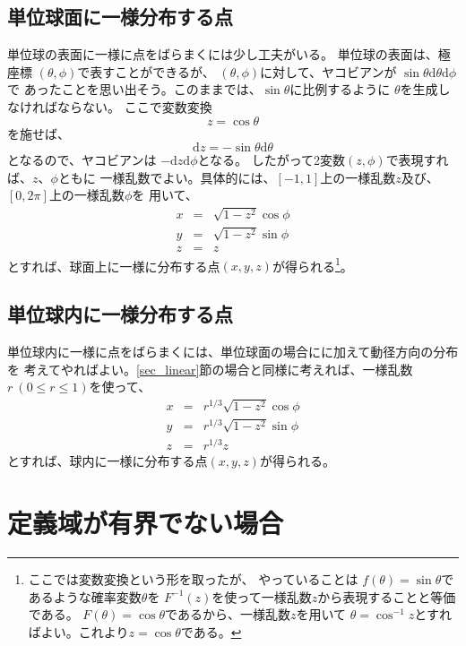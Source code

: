 \documentclass{jarticle}
\newcommand{\diff}{{\mathrm d}}
\begin{document}
\subsection{単位球面に一様分布する点}

単位球の表面に一様に点をばらまくには少し工夫がいる。
単位球の表面は、極座標 $(\theta,\phi)$で表すことができるが、
$(\theta,\phi)$に対して、ヤコビアンが $\sin \theta \diff \theta \diff \phi$で
あったことを思い出そう。このままでは、$\sin \theta$に比例するように
$\theta$を生成しなければならない。
ここで変数変換
\begin{equation}
z = \cos \theta
\end{equation}
を施せば、
\begin{equation}
\diff z = -\sin \theta \diff \theta
\end{equation}
となるので、ヤコビアンは $-\diff z \diff \phi$となる。
したがって2変数$(z,\phi)$で表現すれば、$z$、$\phi$ともに
一様乱数でよい。具体的には、$[-1,1]$上の一様乱数$z$及び、$[0,2\pi]$上の一様乱数$\phi$を
用いて、
\begin{eqnarray}
x &=& \sqrt{1-z^2} \cos \phi \\
y &=& \sqrt{1-z^2} \sin \phi\\
z &=& z 
\end{eqnarray}
とすれば、球面上に一様に分布する点$(x,y,z)$が得られる\footnote{
ここでは変数変換という形を取ったが、
やっていることは $f(\theta) = \sin \theta$であるような確率変数$\theta$を
$F^{-1}(z)$を使って一様乱数$z$から表現することと等価である。
$F(\theta) = \cos \theta$であるから、一様乱数$z$を用いて
$\theta = \cos^{-1} z$とすればよい。これより$z = \cos \theta$である。
}。

\subsection{単位球内に一様分布する点}

単位球内に一様に点をばらまくには、単位球面の場合にに加えて動径方向の分布を
考えてやればよい。\ref{sec_linear}節の場合と同様に考えれば、一様乱数$r~(0\le r \le 1)$を使って、
\begin{eqnarray}
x &=& r^{1/3} \sqrt{1-z^2} \cos \phi \\
y &=& r^{1/3} \sqrt{1-z^2} \sin \phi\\
z &=& r^{1/3} z 
\end{eqnarray}
とすれば、球内に一様に分布する点$(x,y,z)$が得られる。

\section{定義域が有界でない場合}
\end{document}
